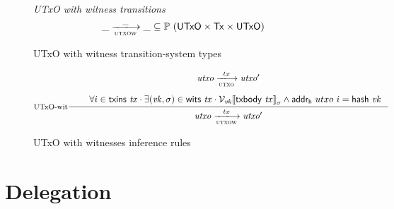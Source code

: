 \documentclass[11pt,a4paper]{article}
\newcommand{\Tx}{\type{Tx}}
\newcommand{\UTxO}{\type{UTxO}}
\newcommand{\txins}[1]{\fun{txins}~ \var{#1}}
\newcommand{\wits}[1]{\fun{wits}~ \var{#1}}
\newcommand{\serialised}[1]{\llbracket \var{#1} \rrbracket}
\newcommand{\hash}[1]{\fun{hash}~ \var{#1}}
\newcommand{\txbody}[1]{\fun{txbody}~ \var{#1}}
\begin{document}
\begin{figure}
  \emph{UTxO with witness transitions}
  \begin{equation*}
    \var{\_} \trans{utxow}{\_} \var{\_}
    \subseteq \powerset (\UTxO \times \Tx \times \UTxO)
  \end{equation*}
  \caption{UTxO with witness transition-system types}
  \label{fig:ts-types:utxow}
\end{figure}

\begin{figure}
  \begin{equation}
    \label{eq:utxo-witness-inductive}
    \inference[UTxO-wit]
    { \var{utxo} \trans{utxo}{tx} \var{utxo'}\\ ~ \\
      & \forall i \in \txins{tx} \cdot \exists (\var{vk}, \sigma) \in \wits{\var{tx}}
      \cdot
      \mathcal{V}_{\var{vk}}{\serialised{\txbody{tx}}}_{\sigma}
      \wedge  \fun{addr_h}~{utxo}~i = \hash{vk}\\
    }
    {\var{utxo} \trans{utxow}{tx} \var{utxo'}}
  \end{equation}
  \caption{UTxO with witnesses inference rules}
  \label{fig:rules:utxow}
\end{figure}

\section{Delegation}
\label{sec:delegation}




\end{document}
